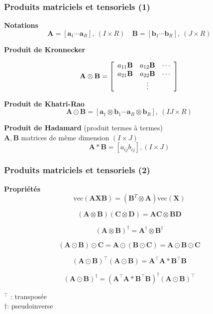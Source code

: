 \documentclass[9pt]{beamer}
\begin{document}
\begin{frame}
\frametitle{Produits matriciels et tensoriels (1)}
\textbf{Notations}
$$ \mathbf{A} = [\mathbf{a}_1 \cdots \mathbf{a}_R], \ (I \times R)
\quad
\mathbf{B} = [\mathbf{b}_1 \cdots \mathbf{b}_R], \ (J \times R)$$

\textbf{Produit de Kronnecker}

$$ \mathbf{A} \otimes  \mathbf{B}  =
 \left[   \begin{array}{ c c c}
a_{11} \mathbf{B}    &  a_{12} \mathbf{B} & \cdots    \\
a_{21} \mathbf{B}    &  a_{22}  \mathbf{B}& \cdots    \\
                                             &  \vdots                                &     
\end{array} \right]
$$

\textbf{Produit de Khatri-Rao}
 $$ \mathbf{A} \odot  \mathbf{B}  =  [\mathbf{a}_1 \otimes  \mathbf{b}_1 \cdots \mathbf{a}_R  \otimes  \mathbf{b}_R], \ (IJ \times R)$$
 
\textbf{Produit de Hadamard} (produit termes à termes)\\
$\mathbf{A}, \mathbf{B}$ matrices de même dimension $(I \times J)$ 
$$ \mathbf{A} \ast  \mathbf{B}  = [ a_{ij} b_{ij}] , (I \times J)$$
\end{frame}

\begin{frame}
\frametitle{Produits matriciels et tensoriels (2)}

\textbf{Propriétés}\\

\[
\boxed{\text{vec}(\mathbf{A} \mathbf{X}  \mathbf{B}) = (\mathbf{B}^{T} \otimes \mathbf{A})\text{vec}(\mathbf{X})} 
\]

$$
(\mathbf{A} \otimes  \mathbf{B}  ) (\mathbf{C} \otimes  \mathbf{D}  ) = \mathbf{A}   \mathbf{C}  \otimes \mathbf{B}   \mathbf{D} 
$$

$$
(\mathbf{A} \otimes  \mathbf{B}  )^\dagger = \mathbf{A}^\dagger \otimes  \mathbf{B}^\dagger  
$$


$$
(\mathbf{A} \odot  \mathbf{B}  )\odot \mathbf{C} = \mathbf{A} \odot (\mathbf{B}  \odot \mathbf{C} ) = \mathbf{A} \odot  \mathbf{B}  \odot \mathbf{C}
$$

$$
(\mathbf{A} \odot  \mathbf{B} )^\top (\mathbf{A} \odot  \mathbf{B} ) = \mathbf{A}^\top \mathbf{A} \ast   \mathbf{B}^\top \mathbf{B}
$$

$$
(\mathbf{A} \odot  \mathbf{B} )^\dagger = (\mathbf{A}^\top \mathbf{A} \ast   \mathbf{B}^\top \mathbf{B})^\dagger (\mathbf{A} \odot  \mathbf{B} )^\top
$$



$^\top$ : transposée\\
$\dagger$: pseudoinverse

\end{frame}
\end{document}
